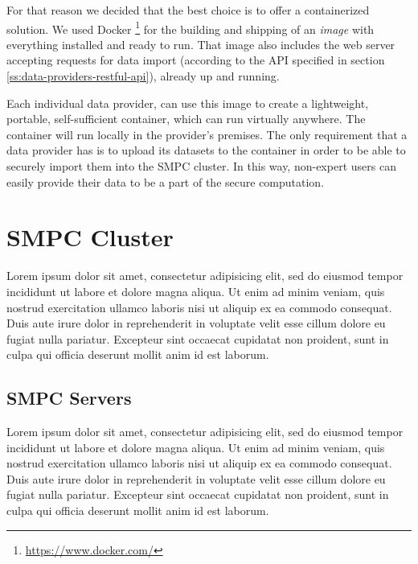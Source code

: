 For that reason we decided that the best choice is to offer a containerized solution. We used Docker \footnote{\href{https://www.docker.com/}{https://www.docker.com/}} for the building and shipping of an \textit{image} with everything installed and ready to run.
That image also includes the web server accepting requests for data import (according to the API specified in section \ref{ss:data-providers-restful-api}), already up and running.

Each individual data provider, can use this image to create a lightweight, portable, self-sufficient container, which can run virtually anywhere.
The container will run locally in the provider's premises.
The only requirement that a data provider has is to upload its datasets to the container in order to be able to securely import them into the SMPC cluster. In this way, non-expert users can easily provide their data to be a part of the secure computation.




\section{SMPC Cluster}\label{s:impl-smpc-cluster}
Lorem ipsum dolor sit amet, consectetur adipisicing elit, sed do eiusmod tempor incididunt ut labore et dolore magna aliqua. Ut enim ad minim veniam, quis nostrud exercitation ullamco laboris nisi ut aliquip ex ea commodo consequat. Duis aute irure dolor in reprehenderit in voluptate velit esse cillum dolore eu fugiat nulla pariatur. Excepteur sint occaecat cupidatat non proident, sunt in culpa qui officia deserunt mollit anim id est laborum.

\subsection{SMPC Servers}\label{ss:smpc-cluster-servers}
Lorem ipsum dolor sit amet, consectetur adipisicing elit, sed do eiusmod tempor incididunt ut labore et dolore magna aliqua. Ut enim ad minim veniam, quis nostrud exercitation ullamco laboris nisi ut aliquip ex ea commodo consequat. Duis aute irure dolor in reprehenderit in voluptate velit esse cillum dolore eu fugiat nulla pariatur. Excepteur sint occaecat cupidatat non proident, sunt in culpa qui officia deserunt mollit anim id est laborum.




